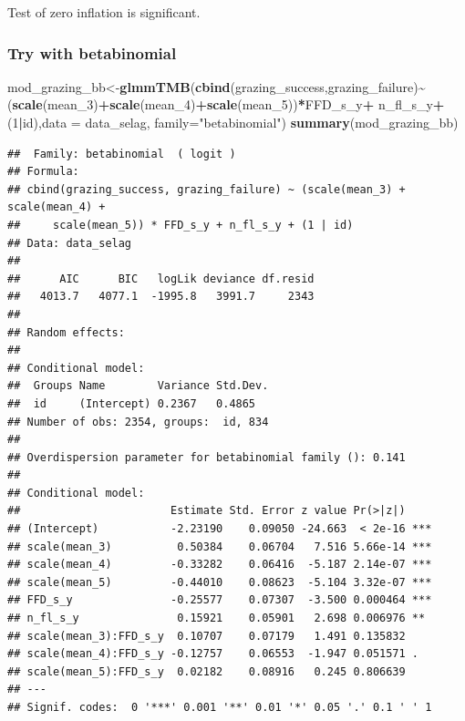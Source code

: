 \documentclass[
]{article}
\newenvironment{Shaded}{\begin{snugshade}}{\end{snugshade}}
\newcommand{\DataTypeTok}[1]{\textcolor[rgb]{0.13,0.29,0.53}{#1}}
\newcommand{\DecValTok}[1]{\textcolor[rgb]{0.00,0.00,0.81}{#1}}
\newcommand{\KeywordTok}[1]{\textcolor[rgb]{0.13,0.29,0.53}{\textbf{#1}}}
\newcommand{\NormalTok}[1]{#1}
\newcommand{\OperatorTok}[1]{\textcolor[rgb]{0.81,0.36,0.00}{\textbf{#1}}}
\newcommand{\StringTok}[1]{\textcolor[rgb]{0.31,0.60,0.02}{#1}}
\begin{document}
Test of zero inflation is significant.

\hypertarget{try-with-betabinomial}{%
\subsubsection{Try with betabinomial}\label{try-with-betabinomial}}

\begin{Shaded}
\begin{Highlighting}[]
\NormalTok{mod\_grazing\_bb\textless{}{-}}\KeywordTok{glmmTMB}\NormalTok{(}\KeywordTok{cbind}\NormalTok{(grazing\_success,grazing\_failure)}\OperatorTok{\textasciitilde{}}
\StringTok{                       }\NormalTok{(}\KeywordTok{scale}\NormalTok{(mean\_}\DecValTok{3}\NormalTok{)}\OperatorTok{+}\KeywordTok{scale}\NormalTok{(mean\_}\DecValTok{4}\NormalTok{)}\OperatorTok{+}\KeywordTok{scale}\NormalTok{(mean\_}\DecValTok{5}\NormalTok{))}\OperatorTok{*}\NormalTok{FFD\_s\_y}\OperatorTok{+}
\StringTok{                       }\NormalTok{n\_fl\_s\_y}\OperatorTok{+}\NormalTok{(}\DecValTok{1}\OperatorTok{|}\NormalTok{id),}\DataTypeTok{data =}\NormalTok{ data\_selag,}
                     \DataTypeTok{family=}\StringTok{"betabinomial"}\NormalTok{)}
\KeywordTok{summary}\NormalTok{(mod\_grazing\_bb)}
\end{Highlighting}
\end{Shaded}

\begin{verbatim}
##  Family: betabinomial  ( logit )
## Formula:          
## cbind(grazing_success, grazing_failure) ~ (scale(mean_3) + scale(mean_4) +  
##     scale(mean_5)) * FFD_s_y + n_fl_s_y + (1 | id)
## Data: data_selag
## 
##      AIC      BIC   logLik deviance df.resid 
##   4013.7   4077.1  -1995.8   3991.7     2343 
## 
## Random effects:
## 
## Conditional model:
##  Groups Name        Variance Std.Dev.
##  id     (Intercept) 0.2367   0.4865  
## Number of obs: 2354, groups:  id, 834
## 
## Overdispersion parameter for betabinomial family (): 0.141 
## 
## Conditional model:
##                       Estimate Std. Error z value Pr(>|z|)    
## (Intercept)           -2.23190    0.09050 -24.663  < 2e-16 ***
## scale(mean_3)          0.50384    0.06704   7.516 5.66e-14 ***
## scale(mean_4)         -0.33282    0.06416  -5.187 2.14e-07 ***
## scale(mean_5)         -0.44010    0.08623  -5.104 3.32e-07 ***
## FFD_s_y               -0.25577    0.07307  -3.500 0.000464 ***
## n_fl_s_y               0.15921    0.05901   2.698 0.006976 ** 
## scale(mean_3):FFD_s_y  0.10707    0.07179   1.491 0.135832    
## scale(mean_4):FFD_s_y -0.12757    0.06553  -1.947 0.051571 .  
## scale(mean_5):FFD_s_y  0.02182    0.08916   0.245 0.806639    
## ---
## Signif. codes:  0 '***' 0.001 '**' 0.01 '*' 0.05 '.' 0.1 ' ' 1
\end{verbatim}
\end{document}

